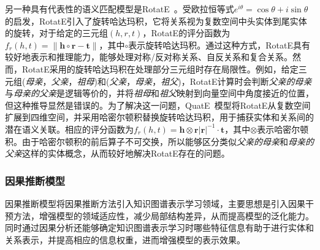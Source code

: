 \documentclass[algorithmlist, AutoFakeBold, AutoFakeSlant, figurelist, tablelist, nomlist, engineering]{seuthesix}
\begin{document}
另一种具有代表性的语义匹配模型是RotatE~\cite{sun2018rotate}。受欧拉恒等式$e^{i \theta}=\cos \theta + i \sin \theta$的启发，RotatE引入了旋转哈达玛积，它将关系视为复数空间中头实体到尾实体的旋转，对于给定的三元组$(h, r, t)$，RotatE的评分函数为$f_r(h, t) = \|\bm{h} \circ \bm{r} - \bm{t}\|$，其中$\circ$表示旋转哈达玛积。通过这种方式，RotatE具有较好地表示和推理能力，能够处理对称/反对称关系、自反关系和复合关系。然而，RotatE采用的旋转哈达玛积在处理部分三元组时存在局限性。例如，给定三元组(\textit{母亲}，\textit{父亲}，\textit{祖母})和(\textit{父亲}，\textit{母亲}，\textit{祖父})，RotatE计算时会判断\textit{父亲的母亲}与\textit{母亲的父亲}是逻辑等价的，并将\textit{祖母}和\textit{祖父}映射到向量空间中角度接近的位置，但这种推导显然是错误的。为了解决这一问题，QuatE~\cite{zhang2019quaternion}模型将RotatE从复数空间扩展到四维空间，并采用哈密尔顿积替换旋转哈达玛积，用于捕获实体和关系间的潜在语义关联。相应的评分函数为$f_r(h, t)=\bm{h} \otimes \bm{r}|\bm{r}|^{-1} \cdot \bm{t}$，其中$\otimes$表示哈密尔顿积。由于哈密尔顿积的前后算子不可交换，所以能够区分类似\textit{父亲的母亲}和\textit{母亲的父亲}这样的实体概念，从而较好地解决RotatE存在的问题。

\subsubsection{因果推断模型}
因果推断模型将因果推断方法引入知识图谱表示学习领域，主要思想是引入因果干预方法，增强模型的领域适应性，减少局部结构差异，从而提高模型的泛化能力。同时通过因果分析还能够确定知识图谱表示学习时哪些特征信息有助于进行实体和关系表示，并提高相应的信息权重，进而增强模型的表示效果。
\end{document}
